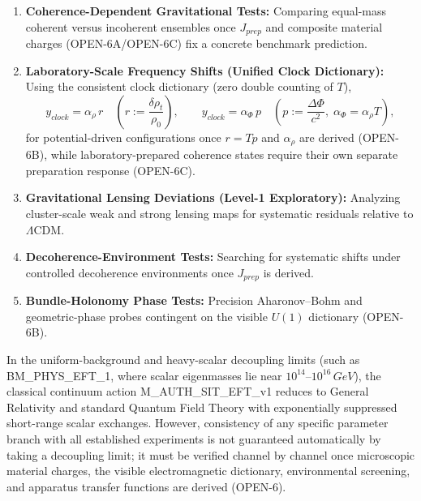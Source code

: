 \documentclass[american,11pt,letterpaper]{article}
\def\mathcal#1{#1}%
\def\mathrm#1{#1}%
\def\texttt#1{#1}%
\def\emph#1{#1}%
\begin{document}
\begin{enumerate}
    \item \textbf{Coherence-Dependent Gravitational Tests:} Comparing equal-mass coherent versus incoherent ensembles once $J_{\mathrm{prep}}$ and composite material charges (\texttt{OPEN-6A}/\texttt{OPEN-6C}) fix a concrete benchmark prediction.

    \item \textbf{Laboratory-Scale Frequency Shifts (Unified Clock Dictionary):} Using the consistent clock dictionary (zero double counting of $\mathcal{T}$),
    \[
    y_{\mathrm{clock}} = \alpha_\rho\,r \quad \left(r := \frac{\delta\rho_t}{\rho_0}\right),
    \qquad
    y_{\mathrm{clock}} = \alpha_\Phi\,p \quad \left(p := \frac{\Delta\Phi}{c^2},\;\alpha_\Phi = \alpha_\rho\mathcal{T}\right),
    \]
    for potential-driven configurations once $r = \mathcal{T} p$ and $\alpha_\rho$ are derived (\texttt{OPEN-6B}), while laboratory-prepared coherence states require their own separate preparation response (\texttt{OPEN-6C}).

    \item \textbf{Gravitational Lensing Deviations (Level-1 Exploratory):} Analyzing cluster-scale weak and strong lensing maps for systematic residuals relative to $\Lambda$CDM.

    \item \textbf{Decoherence-Environment Tests:} Searching for systematic shifts under controlled decoherence environments once $J_{\mathrm{prep}}$ is derived.

    \item \textbf{Bundle-Holonomy Phase Tests:} Precision Aharonov--Bohm and geometric-phase probes contingent on the visible $U(1)$ dictionary (\texttt{OPEN-6B}).
\end{enumerate}

In the uniform-background and heavy-scalar decoupling limits (such as \texttt{BM\_PHYS\_EFT\_1}, where scalar eigenmasses lie near $10^{14}\text{--}10^{16}\,\mathrm{GeV}$), the classical continuum action \texttt{M\_AUTH\_SIT\_EFT\_v1} reduces to General Relativity and standard Quantum Field Theory with exponentially suppressed short-range scalar exchanges. However, consistency of any specific parameter branch with all established experiments is \emph{not} guaranteed automatically by taking a decoupling limit; it must be verified channel by channel once microscopic material charges, the visible electromagnetic dictionary, environmental screening, and apparatus transfer functions are derived (\texttt{OPEN-6}).
\end{document}
